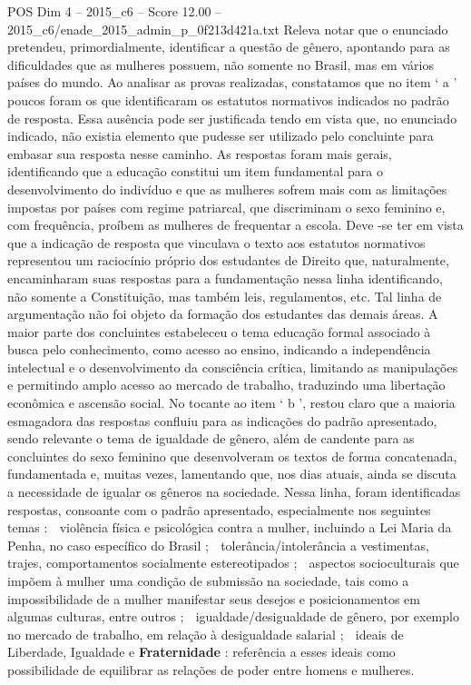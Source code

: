 \begin{textsample}{POS Dim 4 – 2015\_c6 – Score 12.00 – 2015\_c6/enade\_2015\_admin\_p\_0f213d421a.txt}
Releva notar que o enunciado pretendeu, primordialmente, identificar a questão de gênero, apontando para as dificuldades que as mulheres possuem, não somente no Brasil, mas em vários países do mundo.
Ao analisar as provas realizadas, constatamos que no item ‘ a ’ poucos foram os que identificaram os estatutos normativos indicados no padrão de resposta.
Essa ausência pode ser justificada tendo em vista que, no enunciado indicado, não existia elemento que pudesse ser utilizado pelo concluinte para embasar sua resposta nesse caminho.
As respostas foram mais gerais, identificando que a educação constitui um item fundamental para o desenvolvimento do indivíduo e que as mulheres sofrem mais com as limitações impostas por países com regime patriarcal, que discriminam o sexo feminino e, com frequência, proíbem as mulheres de frequentar a escola.
Deve -se ter em vista que a indicação de resposta que vinculava o texto aos estatutos normativos representou um raciocínio próprio dos estudantes de Direito que, naturalmente, encaminharam suas respostas para a fundamentação nessa linha identificando, não somente a Constituição, mas também leis, regulamentos, etc.
Tal linha de argumentação não foi objeto da formação dos estudantes das demais áreas.
A maior parte dos concluintes estabeleceu o tema educação formal associado à busca pelo conhecimento, como acesso ao ensino, indicando a independência intelectual e o desenvolvimento da consciência crítica, limitando as manipulações e permitindo amplo acesso ao mercado de trabalho, traduzindo uma libertação econômica e ascensão social.
No tocante ao item ‘ b ’, restou claro que a maioria esmagadora das respostas confluiu para as indicações do padrão apresentado, sendo relevante o tema de igualdade de gênero, além de candente para as concluintes do sexo feminino que desenvolveram os textos de forma concatenada, fundamentada e, muitas vezes, lamentando que, nos dias atuais, ainda se discuta a necessidade de igualar os gêneros na sociedade.
Nessa linha, foram identificadas respostas, consoante com o padrão apresentado, especialmente nos seguintes temas :  violência física e psicológica contra a mulher, incluindo a Lei Maria da Penha, no caso específico do Brasil ;  tolerância/intolerância a vestimentas, trajes, comportamentos socialmente estereotipados ;  aspectos socioculturais que impõem à mulher uma condição de submissão na sociedade, tais como a impossibilidade de a mulher manifestar seus desejos e posicionamentos em algumas culturas, entre outros ;  igualdade/desigualdade de gênero, por exemplo no mercado de trabalho, em relação à desigualdade salarial ;  ideais de Liberdade, Igualdade e \textbf{Fraternidade} : referência a esses ideais como possibilidade de equilibrar as relações de poder entre homens e mulheres.

\end{textsample}
